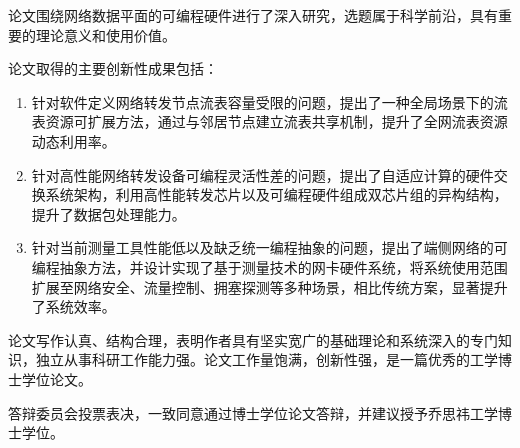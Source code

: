 



论文围绕网络数据平面的可编程硬件进行了深入研究，选题属于科学前沿，具有重要的理论意义和使用价值。

论文取得的主要创新性成果包括：
\begin{enumerate}
	\item 针对软件定义网络转发节点流表容量受限的问题，提出了一种全局场景下的流表资源可扩展方法，通过与邻居节点建立流表共享机制，提升了全网流表资源动态利用率。
	\item 针对高性能网络转发设备可编程灵活性差的问题，提出了自适应计算的硬件交换系统架构，利用高性能转发芯片以及可编程硬件组成双芯片组的异构结构，提升了数据包处理能力。
	\item 针对当前测量工具性能低以及缺乏统一编程抽象的问题，提出了端侧网络的可编程抽象方法，并设计实现了基于测量技术的网卡硬件系统，将系统使用范围扩展至网络安全、流量控制、拥塞探测等多种场景，相比传统方案，显著提升了系统效率。
\end{enumerate}

论文写作认真、结构合理，表明作者具有坚实宽广的基础理论和系统深入的专门知识，独立从事科研工作能力强。论文工作量饱满，创新性强，是一篇优秀的工学博士学位论文。

答辩委员会投票表决，一致同意通过博士学位论文答辩，并建议授予乔思祎工学博士学位。






